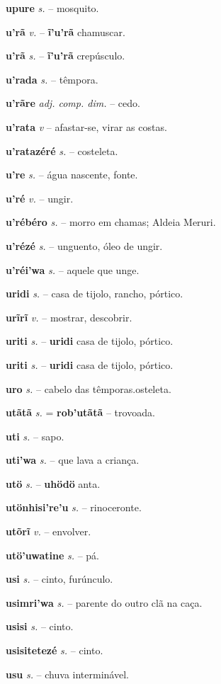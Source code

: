 \textbf{upure} \textit{s.} -- mosquito.

\textbf{u'rã} \textit{v.} -- \textbf{ĩ'u'rã} chamuscar.

\textbf{u'rã} \textit{s.} -- \textbf{ĩ'u'rã} crepúsculo.

\textbf{u'rada} \textit{s.} -- têmpora.

\textbf{u'rãre} \textit{adj. comp. dim.} -- cedo.

\textbf{u'rata} \textit{v} -- afastar-se, virar as costas.

\textbf{u'ratazéré} \textit{s.} -- costeleta.

\textbf{u're} \textit{s.} -- água nascente, fonte.

\textbf{u'ré} \textit{v.} -- ungir.

\textbf{u'rébéro} \textit{s.} -- morro em chamas; Aldeia Meruri.

\textbf{u'rézé} \textit{s.} -- unguento, óleo de ungir.

\textbf{u'réi'wa} \textit{s.} -- aquele que unge.

\textbf{uridi} \textit{s.} -- casa de tijolo, rancho, pórtico.

\textbf{urĩrĩ} \textit{v.} -- mostrar, descobrir.

\textbf{uriti} \textit{s.} -- \textbf{uridi} casa de tijolo, pórtico.

\textbf{uriti} \textit{s.} -- \textbf{uridi} casa de tijolo, pórtico.

\textbf{uro} \textit{s.} -- cabelo das têmporas.osteleta.

\textbf{utãtã} \textit{s.} = \textbf{rob'utãtã} -- trovoada.

\textbf{uti} \textit{s.} -- sapo.

\textbf{uti'wa} \textit{s.} -- que lava a criança.

\textbf{utö} \textit{s.} -- \textbf{uhödö} anta.

\textbf{utönhisi're'u} \textit{s.} -- rinoceronte.

\textbf{utõrĩ} \textit{v.} -- envolver.

\textbf{utö'uwatine} \textit{s.} -- pá.

\textbf{usi} \textit{s.} -- cinto, furúnculo.

\textbf{usimri'wa} \textit{s.} -- parente do outro clã na caça.

\textbf{usisi} \textit{s.} -- cinto.

\textbf{usisitetezé} \textit{s.} -- cinto.

\textbf{usu} \textit{s.} -- chuva interminável.

